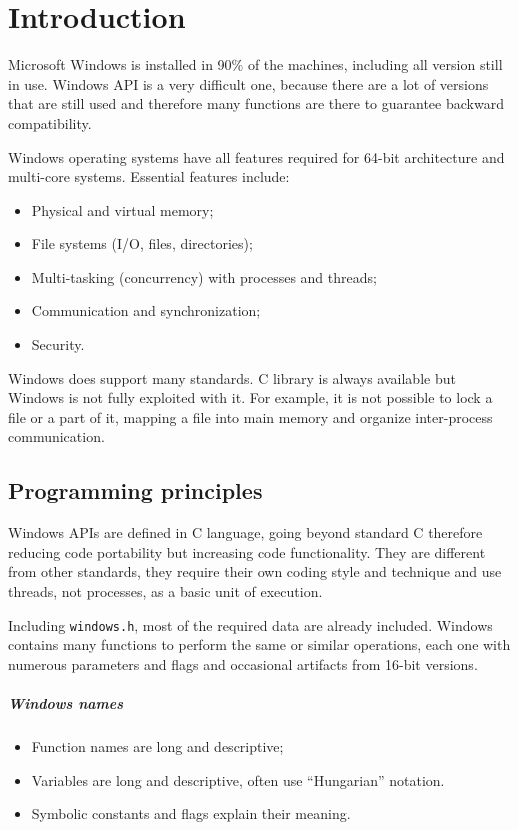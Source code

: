 \chapter{Introduction}
Microsoft Windows is installed in 90\% of the machines, including all version still in use. Windows API is a very difficult one, because there are a lot of versions that are still used and therefore many functions are there to guarantee backward compatibility.

Windows operating systems have all features required for 64-bit architecture and multi-core systems. Essential features include:
\begin{itemize}
\item Physical and virtual memory;
\item File systems (I/O, files, directories);
\item Multi-tasking (concurrency) with processes and threads;
\item Communication and synchronization;
\item Security.
\end{itemize}
Windows does support many standards. C library is always available but Windows is not fully exploited with it. For example, it is not possible to lock a file or a part of it, mapping a file into main memory and organize inter-process communication.

\section{Programming principles}
Windows APIs are defined in C language, going beyond standard C therefore reducing code portability but increasing code functionality. They are different from other standards, they require their own coding style and technique and use threads, not processes, as a basic unit of execution.

Including \texttt{windows.h}, most of the required data are already included. Windows contains many functions to perform the same or similar operations, each one with numerous parameters and flags and occasional artifacts from 16-bit versions.

\paragraph{Windows names}
\begin{itemize}
\item Function names are long and descriptive;
\item Variables are long and descriptive, often use ``Hungarian'' notation.
\item Symbolic constants and flags explain their meaning.
\end{itemize}


